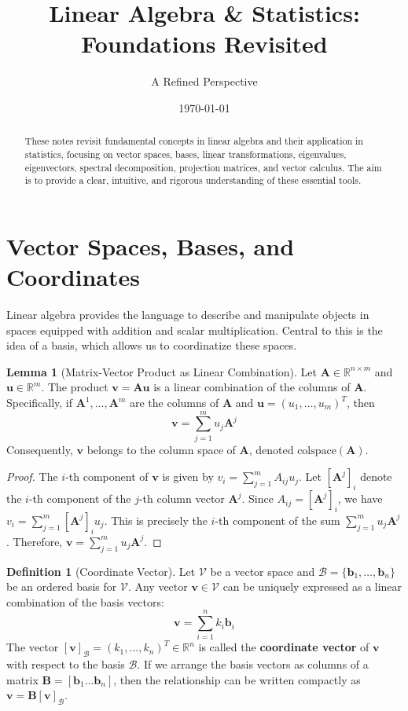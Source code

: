 \documentclass[12pt, letterpaper]{article}
\title{\texorpdfstring{\textbf{Linear Algebra \& Statistics: Foundations Revisited}}{\textbf{Linear Algebra and Statistics: Foundations Revisited}}}
\author{A Refined Perspective}
\date{\today}
\theoremstyle{definition}
\newtheorem{definition}{Definition}[section]
\newtheorem{lemma}{Lemma}[section]
\newcommand{\R}{\mathbb{R}}
\newcommand{\V}{\mathcal{V}}
\newcommand{\B}{\mathcal{B}}
\newcommand{\mat}[1]{\mathbf{#1}} %
\newcommand{\vect}[1]{\mathbf{#1}} %
\renewcommand{\v}{\vect{v}} %
\newcommand{\uvec}{\vect{u}} %
\newcommand{\bvec}{\vect{b}} %
\newcommand{\colspace}{\text{colspace}}
\begin{document}
\maketitle

\begin{abstract}
    These notes revisit fundamental concepts in linear algebra and their application in statistics, focusing on vector spaces, bases, linear transformations, eigenvalues, eigenvectors, spectral decomposition, projection matrices, and vector calculus. The aim is to provide a clear, intuitive, and rigorous understanding of these essential tools.
\end{abstract}

\section{Vector Spaces, Bases, and Coordinates}

Linear algebra provides the language to describe and manipulate objects in spaces equipped with addition and scalar multiplication. Central to this is the idea of a basis, which allows us to coordinatize these spaces.

\begin{lemma}[Matrix-Vector Product as Linear Combination]
Let $\mat{A} \in \R^{n \times m}$ and $\uvec \in \R^m$. The product $\v = \mat{A}\uvec$ is a linear combination of the columns of $\mat{A}$. Specifically, if $\mat{A}^1, \dots, \mat{A}^m$ are the columns of $\mat{A}$ and $\uvec = (u_1, \dots, u_m)^T$, then
\[ \v = \sum_{j=1}^m u_j \mat{A}^j \]
Consequently, $\v$ belongs to the column space of $\mat{A}$, denoted $\colspace(\mat{A})$.
\end{lemma}
\begin{proof}
The $i$-th component of $\v$ is given by $v_i = \sum_{j=1}^m A_{ij} u_j$. Let $[\mat{A}^j]_i$ denote the $i$-th component of the $j$-th column vector $\mat{A}^j$. Since $A_{ij} = [\mat{A}^j]_i$, we have $v_i = \sum_{j=1}^m [\mat{A}^j]_i u_j$. This is precisely the $i$-th component of the sum $\sum_{j=1}^m u_j \mat{A}^j$. Therefore, $\v = \sum_{j=1}^m u_j \mat{A}^j$.
\end{proof}

\begin{definition}[Coordinate Vector]
Let $\V$ be a vector space and $\B = \{\bvec_1, \dots, \bvec_n\}$ be an ordered basis for $\V$. Any vector $\v \in \V$ can be uniquely expressed as a linear combination of the basis vectors:
\[ \v = \sum_{i=1}^n k_i \bvec_i \]
The vector $[\v]_\B = (k_1, \dots, k_n)^T \in \R^n$ is called the \textbf{coordinate vector} of $\v$ with respect to the basis $\B$.
If we arrange the basis vectors as columns of a matrix $\mat{B} = [\bvec_1 \dots \bvec_n]$, then the relationship can be written compactly as $\v = \mat{B} [\v]_\B$.
\end{definition}
\end{document}
